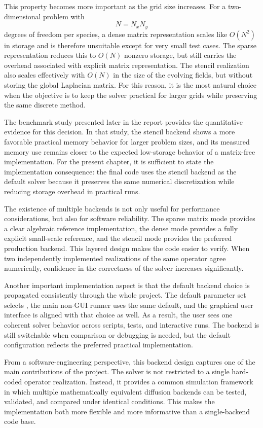 This property becomes more important as the grid size increases. For a two-dimensional problem with
\[
N = N_x N_y
\]
degrees of freedom per species, a dense matrix representation scales like \(O(N^2)\) in storage and is therefore unsuitable except for very small test cases. The sparse representation reduces this to \(O(N)\) nonzero storage, but still carries the overhead associated with explicit matrix representation. The stencil realization also scales effectively with \(O(N)\) in the size of the evolving fields, but without storing the global Laplacian matrix. For this reason, it is the most natural choice when the objective is to keep the solver practical for larger grids while preserving the same discrete method.

The benchmark study presented later in the report provides the quantitative evidence for this decision. In that study, the stencil backend shows a more favorable practical memory behavior for larger problem sizes, and its measured memory use remains closer to the expected low-storage behavior of a matrix-free implementation. For the present chapter, it is sufficient to state the implementation consequence: the final code uses the stencil backend as the default solver because it preserves the same numerical discretization while reducing storage overhead in practical runs.

The existence of multiple backends is not only useful for performance considerations, but also for software reliability. The sparse matrix mode provides a clear algebraic reference implementation, the dense mode provides a fully explicit small-scale reference, and the stencil mode provides the preferred production backend. This layered design makes the code easier to verify. When two independently implemented realizations of the same operator agree numerically, confidence in the correctness of the solver increases significantly.

Another important implementation aspect is that the default backend choice is propagated consistently through the whole project. The default parameter set selects , the main non-GUI runner uses the same default, and the graphical user interface is aligned with that choice as well. As a result, the user sees one coherent solver behavior across scripts, tests, and interactive runs. The backend is still switchable when comparison or debugging is needed, but the default configuration reflects the preferred practical implementation.

From a software-engineering perspective, this backend design captures one of the main contributions of the project. The solver is not restricted to a single hard-coded operator realization. Instead, it provides a common simulation framework in which multiple mathematically equivalent diffusion backends can be tested, validated, and compared under identical conditions. This makes the implementation both more flexible and more informative than a single-backend code base.

